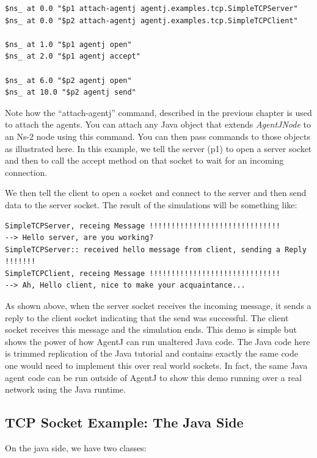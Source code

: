  \footnotesize
 \begin{verbatim}
$ns_ at 0.0 "$p1 attach-agentj agentj.examples.tcp.SimpleTCPServer"
$ns_ at 0.0 "$p2 attach-agentj agentj.examples.tcp.SimpleTCPClient"

$ns_ at 1.0 "$p1 agentj open"
$ns_ at 2.0 "$p1 agentj accept"

$ns_ at 6.0 "$p2 agentj open"
$ns_ at 10.0 "$p2 agentj send"
 \end{verbatim}
 \normalsize

\noindent Note how the ``attach-agentj'' command, described in the previous chapter is used to attach the agents.  You can attach any Java object that extends \emph{AgentJNode} to an Ns-2 node using this command.  You can then pass commands to those objects as illustrated here. In this example, we tell the server (p1) to open a server socket and then to call the accept method on that socket to wait for an incoming connection.

We then tell the client to open a socket and connect to the server and then send data to the server socket.  The result of the simulations will be something like:

\footnotesize
\begin{verbatim}
SimpleTCPServer, receing Message !!!!!!!!!!!!!!!!!!!!!!!!!!!!!!
--> Hello server, are you working?
SimpleTCPServer:: received hello message from client, sending a Reply !!!!!!!
SimpleTCPClient, receing Message !!!!!!!!!!!!!!!!!!!!!!!!!!!!!!
--> Ah, Hello client, nice to make your acquaintance...
 \end{verbatim}
 \normalsize

\noindent  As shown above, when the server socket receives the incoming message, it sends a reply to the client socket indicating that the send was successful.  The client socket receives this message and the simulation ends.  This demo is simple but shows the power of how AgentJ can run unaltered Java code.  The Java code here is trimmed replication of the Java tutorial and contains exactly the same code one would need to implement this over real world sockets.  In fact, the same Java agent code can be run outside of AgentJ to show this demo running over a real network using the Java runtime.  

 \subsection{TCP Socket Example: The Java Side}
 \label{sec:tcp:javaside}

On the java side, we have two classes:

